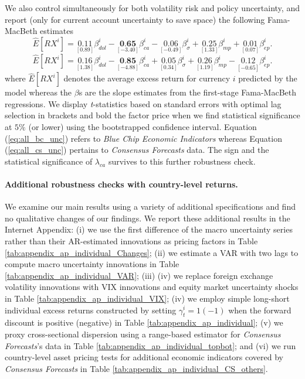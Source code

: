 We also control simultaneously for both volatility risk and policy uncertainty, and report (only for current account uncertainty to save space) the following Fama-MacBeth estimates
\begin{equation} \label{eq:all_bc_unc}
\widehat{E}[RX^{i}] =
\underset{[0.89]}{0.11} \beta_{dol}^{i} -
\underset{[-3.40]}{\textbf{0.65}} \beta_{ca}^{i} -
\underset{[-0.49]}{0.06} \beta_{\sigma}^{i} +
\underset{[1.33]}{0.25} \beta_{mp}^{i} +
\underset{[0.07]}{0.01} \beta_{ep}^{i}.
\end{equation}
\begin{equation} \label{eq:all_cs_unc}
\widehat{E}[RX^{i}] =
\underset{[1.38]}{0.16}           \beta_{dol}^{i} -
\underset{[-4.88]}{\textbf{0.85}} \beta_{ca}^{i} +
\underset{[0.34]}{0.05}           \beta_{\sigma}^{i} +
\underset{[1.19]}{0.26}           \beta_{mp}^{i} -
\underset{[-0.65]}{0.12}          \beta_{ep}^{i}.
\end{equation}
where $\widehat{E}[RX^{i}]$ denotes the average excess return for currency $i$ predicted by the model whereas the $\beta$s are the slope estimates from the first-stage Fama-MacBeth regressions. We display \emph{t}-statistics based on \citet{newey_west1987} standard errors with \citet{andrews1991} optimal lag selection in brackets and bold the factor price when we find statistical significance at $5\%$ (or lower) using the bootstrapped confidence interval. Equation (\ref{eq:all_bc_unc}) refers to \emph{Blue Chip Economic Indicators} whereas Equation (\ref{eq:all_cs_unc}) pertains to \emph{Consensus Forecasts} data. The sign and the statistical significance of $\lambda_{ca}$ survives to this further robustness check.

\paragraph{Additional robustness checks with country-level returns.}
We examine our main results using a variety of additional specifications and find no qualitative changes of our findings. We report these additional results in the Internet Appendix: (i) we use the first difference of the macro uncertainty series rather than their AR-estimated innovations as pricing factors in Table \ref{tab:appendix_ap_individual_Changes}; (ii) we estimate a VAR with two lags to compute macro uncertainty innovations in Table \ref{tab:appendix_ap_individual_VAR}; (iii) (iv) we replace foreign exchange volatility innovations with VIX innovations and equity market uncertainty shocks in Table \ref{tab:appendix_ap_individual_VIX}; (iv) we employ simple long-short individual excess returns constructed by setting $\gamma_{t}^{i} = 1 (-1)$ when the forward discount is positive (negative) in Table \ref{tab:appendix_ap_individual}; (v) we proxy cross-sectional dispersion using a range-based estimator for \emph{Consensus Forecasts}'s data in Table \ref{tab:appendix_ap_individual_topbot}; and (vi) we run country-level asset pricing tests for additional economic indicators covered by \emph{Consensus Forecasts} in Table \ref{tab:appendix_ap_individual_CS_others}.

